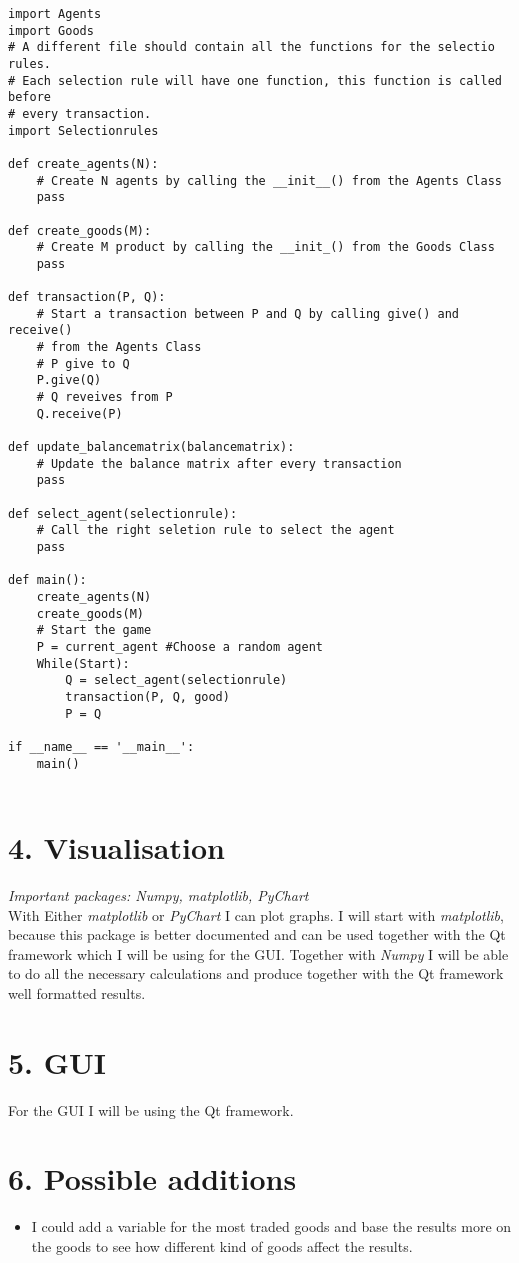 \documentclass{article}
\begin{document}
\begin{lstlisting}
import Agents
import Goods
# A different file should contain all the functions for the selectio rules.
# Each selection rule will have one function, this function is called before
# every transaction.
import Selectionrules

def create_agents(N):
	# Create N agents by calling the __init__() from the Agents Class
	pass

def create_goods(M):
	# Create M product by calling the __init_() from the Goods Class
	pass

def transaction(P, Q):
	# Start a transaction between P and Q by calling give() and receive() 
	# from the Agents Class 
	# P give to Q
	P.give(Q)
	# Q reveives from P
	Q.receive(P)

def update_balancematrix(balancematrix):
	# Update the balance matrix after every transaction
	pass

def select_agent(selectionrule):
	# Call the right seletion rule to select the agent
	pass

def main():
	create_agents(N)
	create_goods(M)
	# Start the game 
	P = current_agent #Choose a random agent
	While(Start):
		Q = select_agent(selectionrule)
		transaction(P, Q, good)
		P = Q

if __name__ == '__main__':
    main()


\end{lstlisting}

\section{4. Visualisation}
\textit{Important packages: Numpy, matplotlib, PyChart}
\\
With Either \textit{matplotlib} or \textit{PyChart} I can plot graphs. I will start with \textit{matplotlib}, because this package is better documented and can be used together with the Qt framework which I will be using for the GUI. Together with \textit{Numpy} I will be able to do all the necessary calculations and produce together with the Qt framework well formatted results.
\section{5. GUI}
For the GUI I will be using the Qt framework.

\section{6. Possible additions}
\begin{itemize}
  \item I could add a variable for the most traded goods and base the results more on the goods to see how different kind of goods affect the results. 
\end{itemize}





\end{document}
